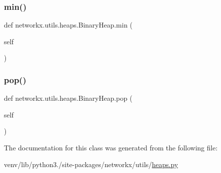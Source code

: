 \subsubsection{\texorpdfstring{min()}{min()}}
{\footnotesize\ttfamily def networkx.\+utils.\+heaps.\+Binary\+Heap.\+min (\begin{DoxyParamCaption}\item[{}]{self }\end{DoxyParamCaption})}

\mbox{\label{classnetworkx_1_1utils_1_1heaps_1_1BinaryHeap_add71fa1aeab6acb75dd5d24a89537782}} 
\subsubsection{\texorpdfstring{pop()}{pop()}}
{\footnotesize\ttfamily def networkx.\+utils.\+heaps.\+Binary\+Heap.\+pop (\begin{DoxyParamCaption}\item[{}]{self }\end{DoxyParamCaption})}



The documentation for this class was generated from the following file\+:\begin{DoxyCompactItemize}
\item 
venv/lib/python3./site-\/packages/networkx/utils/\hyperlink{heaps_8py}{heaps.\+py}\end{DoxyCompactItemize}
